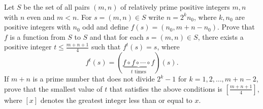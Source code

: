 Let $S$ be the set of all pairs $(m,n)$ of relatively prime positive integers $m,n$ with $n$ even and $m<n$. For $s=(m,n)\in S$ write $n=2^{k}n_0$, where $k,n_0$ are positive integers with $n_0$ odd and define $f(s)=(n_0,m+n-n_0)$.
Prove that $f$ is a function from $S$ to $S$ and that for each $s=(m,n)\in S$, there exists a positive integer $t\leq\frac{m+n+1}{4}$ such that $f^{t}(s)=s$, where
\[
f^{t}(s)=(\underbrace{f\circ f\circ\cdots\circ f}_{t\text{ times}})(s).
\]
If $m+n$ is a prime number that does not divide $2^{k}-1$ for $k=1,2,\ldots,m+n-2$, prove that the smallest value of $t$ that satisfies the above conditions is $\left[\frac{m+n+1}{4}\right]$, where $[x]$ denotes the greatest integer less than or equal to $x$.
